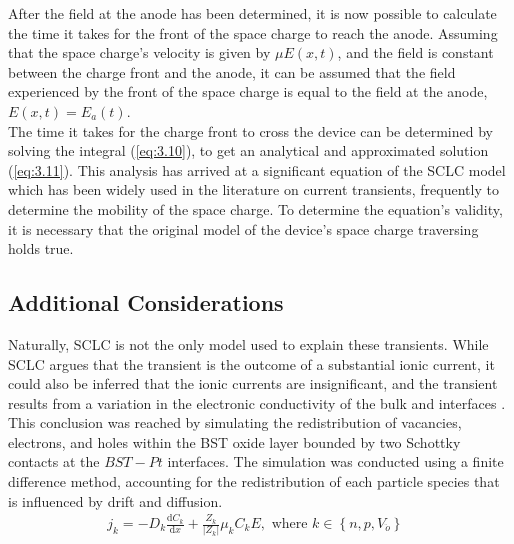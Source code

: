 \noindent After the field at the anode has been determined, it is now possible to calculate the time it takes for the front of the space charge to reach the anode. Assuming that the space charge's velocity is given by $\mu E(x,t)$, and the field is constant between the charge front and the anode, it can be assumed that the field experienced by the front of the space charge is equal to the field at the anode, $E(x,t) = E_a(t)$. \\

\noindent The time it takes for the charge front to cross the device can be determined by solving the integral (\ref{eq:3.10}), to get an analytical and approximated solution (\ref{eq:3.11}). This analysis has arrived at a significant equation of the SCLC model which has been widely used in the literature on current transients, frequently to determine the mobility of the space charge. To determine the equation's validity, it is necessary that the original model of the device's space charge traversing holds true. \\


\subsection[Additional Considerations]{Additional Considerations}

Naturally, SCLC is not the only model used to explain these transients. While SCLC argues that the transient is the outcome of a substantial ionic current, it could also be inferred that the ionic currents are insignificant, and the transient results from a variation in the electronic conductivity of the bulk and interfaces \cite{meyer2005oxygen}. This conclusion was reached by simulating the redistribution of vacancies, electrons, and holes within the BST oxide layer bounded by two Schottky contacts at the $BST-Pt$ interfaces. The simulation was conducted using a finite difference method, accounting for the redistribution of each particle species that is influenced by drift and diffusion. 
\begin{align}
    j_k = -D_k\frac{\mathrm{d} C_k}{\mathrm{d} x} + \frac{Z_k}{|Z_k|} \mu_k C_k E , \mbox{ where $k \in \left \{ n,p,V_{\ddot{o}} \right \}$ } \label{eq:3.13} 
\end{align}

